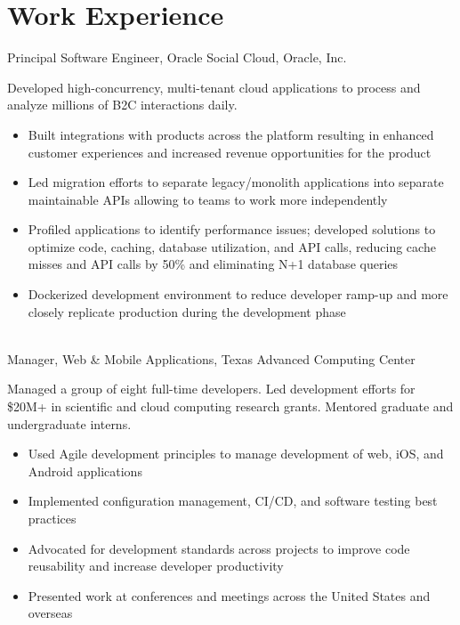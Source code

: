 \documentclass[10pt, a4paper]{article}
\newcommand{\years}[1]{\marginnote{\scriptsize #1}}
\begin{document}
\section*{Work Experience}
\noindent
\years{2016-present}Principal Software Engineer, Oracle Social Cloud, Oracle, Inc.\\[.1cm]
{\small
    Developed high-concurrency, multi-tenant cloud applications to process and analyze millions of B2C interactions daily.
    \begin{itemize}
        \item{Built integrations with products across the platform resulting in enhanced customer experiences and increased revenue opportunities for the product}
        \item{Led migration efforts to separate legacy/monolith applications into separate maintainable APIs allowing to teams to work more independently}
        \item{Profiled applications to identify performance issues; developed solutions to optimize code, caching, database utilization, and API calls, reducing cache misses and API calls by 50\% and eliminating N+1 database queries}
        \item{Dockerized development environment to reduce developer ramp-up and more closely replicate production during the development phase}
    \end{itemize}
}\\
\years{2013-2016}Manager, Web \& Mobile Applications, Texas Advanced Computing Center\\[.1cm]
{\small
    Managed a group of eight full-time developers. Led development efforts for \$20M+ in scientific and cloud computing research grants. Mentored graduate and undergraduate interns.
    \begin{itemize}
        \item{Used Agile development principles to manage development of web, iOS, and Android applications}
        \item{Implemented configuration management, CI/CD, and software testing best practices}
        \item{Advocated for development standards across projects to improve code reusability and increase developer productivity}
        \item{Presented work at conferences and meetings across the United States and overseas}
    \end{itemize}
}\\
\end{document}
